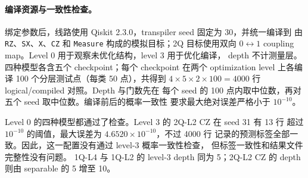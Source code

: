 \paragraph{编译资源与一致性检查。}

绑定参数后，线路使用 Qiskit 2.3.0，transpiler seed 固定为 30，并统一编译到
由 \texttt{RZ}、\texttt{SX}、\texttt{X}、\texttt{CZ} 和
\texttt{Measure} 构成的模拟目标；2Q 目标使用双向
$0\leftrightarrow1$ coupling map。Level 0 用于观察未优化结构，level 3 用于优化编译，
depth 不计测量层。四种模型各含五个 checkpoint；每个 checkpoint 在两个
optimization level 上各编译 100 个分层测试点（每类 50 点），共得到
$4\times5\times2\times100=4000$ 行 logical/compiled 对照。Depth 与门数先在
每个 seed 的 100 点内取中位数，再对五个 seed 取中位数。编译前后的概率一致性
要求最大绝对误差严格小于 $10^{-10}$。

\begin{table}[htbp]
    \centering
    \caption{M2 编译资源。每个模型和 level 含 $5\times100$ 个样本；depth
    与门数报告跨 seed 中位数，最大误差报告全体样本最大值。门数依次为
    RZ/SX/CZ，$X$ 中位数均为 0。}
    \label{tab:m2-compile}
\end{table}

Level 0 的四种模型都通过了检查。Level 3 的 2Q-L2 CZ 在 seed 31 有 13 行
超过 $10^{-10}$ 的阈值，最大误差为 $4.6520\times10^{-10}$，不过 4000 行
记录的预测标签全部一致。因此，这一配置没有通过 level-3 概率一致性检查，
但标签一致性和结果文件完整性没有问题。
1Q-L4 与 1Q-L2 的 level-3 depth 同为 5；2Q-L2 CZ 的 depth 则由 separable
的 5 增至 10。
